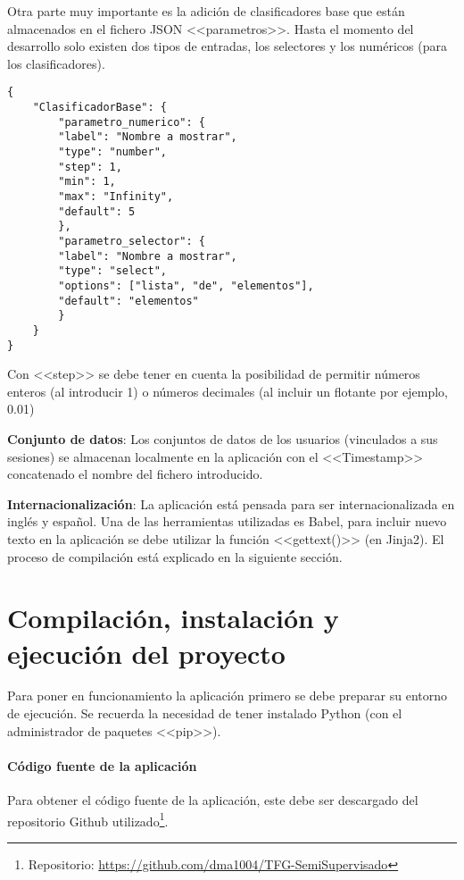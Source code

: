Otra parte muy importante es la adición de clasificadores base que están
almacenados en el fichero JSON <<parametros>>. Hasta el momento del desarrollo
solo existen dos tipos de entradas, los selectores y los numéricos (para los
clasificadores).

\begin{tcolorbox}[colback=cyan!5!white,colframe=cyan!75!black,title=Estructura para añadir clasificadores y sus parámetros]
\begin{verbatim}
{
    "ClasificadorBase": {
        "parametro_numerico": {
        "label": "Nombre a mostrar",
        "type": "number",
        "step": 1,
        "min": 1,
        "max": "Infinity",
        "default": 5
        },
        "parametro_selector": {
        "label": "Nombre a mostrar",
        "type": "select",
        "options": ["lista", "de", "elementos"],
        "default": "elementos"
        }
    }
}
\end{verbatim}
\end{tcolorbox}

Con <<step>> se debe tener en cuenta la posibilidad de permitir números enteros
(al introducir 1) o números decimales (al incluir un flotante por ejemplo, 0.01)

\textbf{Conjunto de datos}: Los conjuntos de datos de los usuarios (vinculados a
sus sesiones) se almacenan localmente en la aplicación con el <<Timestamp>>
concatenado el nombre del fichero introducido.

\textbf{Internacionalización}: La aplicación está pensada para ser
internacionalizada en inglés y español. Una de las herramientas utilizadas es
Babel, para incluir nuevo texto en la aplicación se debe utilizar la función
<<gettext()>> (en Jinja2). El proceso de compilación está explicado en la
siguiente sección.

\clearpage
\section{Compilación, instalación y ejecución del proyecto}

Para poner en funcionamiento la aplicación primero se debe preparar su entorno
de ejecución. Se recuerda la necesidad de tener instalado Python (con el administrador de
paquetes <<pip>>).

\paragraph{Código fuente de la aplicación} Para obtener el código fuente de la
aplicación, este debe ser descargado del repositorio Github utilizado\footnote{
Repositorio: \url{https://github.com/dma1004/TFG-SemiSupervisado}}.


